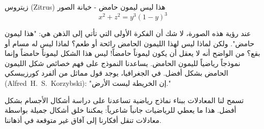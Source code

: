\begin{surferPage}{زيتروس (Zitrus)}
هذا ليس ليمون حامض - خيانة الصور\\
\smallskip
\[x^2 + z^2 = y^3 (1 - y)^3\] 


\singlespacing
عند رؤية هذه الصورة، لا شك أن الفكرة الأولى التي تأتي إلى الذهن هي: "هذا ليمون حامض". ولكن لماذا ليس لهذا الليمون الحامض رائحة أو طعم؟ لماذا ليس له مسام أو بقع؟ من الواضح أنه لا يعقل أن يكون ليموناً حامضاً! 
\singlespacing
ليس هذا الشكل ليموناً حامضاً وإنما نموذجاً رياضياً لليمون الحامض. يساعدنا النموذج على فهم خصائص شكل الليمون الحامض بشكل أفضل. في الجغرافيا، يوجد قول مماثل من ألفرد كورزيبسكي
\textenglish{(Alfred\ H.\ S.\ Korzybski)}: 
 "إن الخريطة ليست الأرض." \\
\singlespacing

تسمح لنا المعادلات ببناء نماذج رياضية تساعدنا على دراسة أشكال الأجسام بشكل أفضل.
\singlespacing
هذا ما يعطي للرياضيات جانباً شاعرياً: يمكننا خلق أشكال جميلة بواسطة معادلات تنقل أفكارنا إلى آفاق غير متوقعة في أذهاننا.
\end{surferPage}

